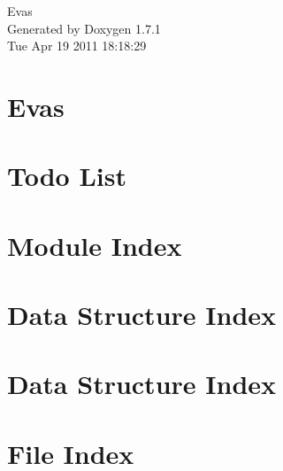 \documentclass[a4paper]{book}
\begin{document}
\begin{titlepage}
\vspace*{7cm}
\begin{center}
{\Large Evas }\\
\vspace*{1cm}
{\large Generated by Doxygen 1.7.1}\\
\vspace*{0.5cm}
{\small Tue Apr 19 2011 18:18:29}\\
\end{center}
\end{titlepage}
\clearemptydoublepage
{}
\tableofcontents
\clearemptydoublepage
{}
\chapter{Evas}
\label{index}\hypertarget{index}{}
\chapter{Todo List}
\label{todo}

\chapter{Module Index}

\chapter{Data Structure Index}

\chapter{Data Structure Index}

\chapter{File Index}

\end{document}
